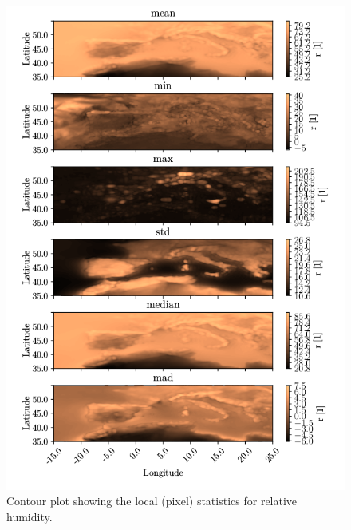 \begin{figure}[ht]
    \centering
    \includegraphics{python_figs/all_stat_variable_r.png}
    \caption{Contour plot showing the local (pixel) statistics for relative humidity.}
    \label{fig:all_stats_r}
\end{figure}


